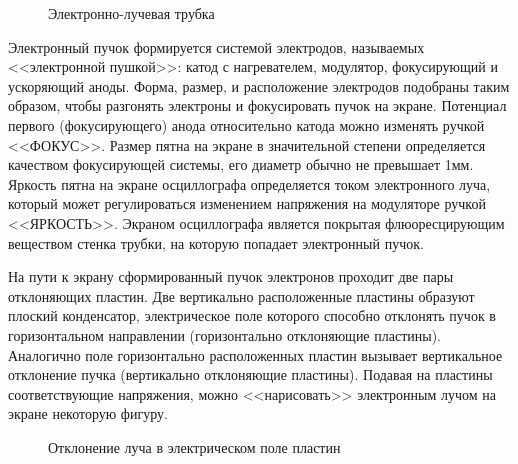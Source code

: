 \documentclass[14pt]{article}
\begin{document}
\begin{figure}[h!]
	\caption{Электронно-лучевая трубка}
	\label{fig:image}
\end{figure}

Электронный пучок формируется системой электродов, называемых <<электронной пушкой>>: катод с нагревателем, модулятор, фокусирующий и ускоряющий аноды. Форма, размер, и расположение электродов подобраны таким образом, чтобы разгонять электроны и фокусировать пучок на экране. Потенциал первого (фокусирующего) анода относительно катода можно изменять ручкой <<ФОКУС>>. Размер пятна на экране в значительной степени определяется качеством фокусирующей системы, его диаметр обычно не превышает 1мм. Яркость пятна на экране осциллографа определяется током электронного луча, который может регулироваться изменением напряжения на модуляторе ручкой <<ЯРКОСТЬ>>. Экраном осциллографа является покрытая флюоресцирующим веществом стенка трубки, на которую попадает электронный пучок.

На пути к экрану сформированный пучок электронов проходит две пары отклоняющих пластин. Две вертикально расположенные пластины образуют плоский конденсатор, электрическое поле которого способно отклонять пучок в горизонтальном направлении (горизонтально отклоняющие пластины). Аналогично поле горизонтально расположенных пластин вызывает вертикальное отклонение пучка (вертикально отклоняющие пластины). Подавая на пластины соответствующие напряжения, можно <<нарисовать>> электронным лучом на экране некоторую фигуру. 

\begin{figure}[h!]
	\caption{Отклонение луча в электрическом поле пластин}
	\label{fig:image}
\end{figure}
\end{document}
